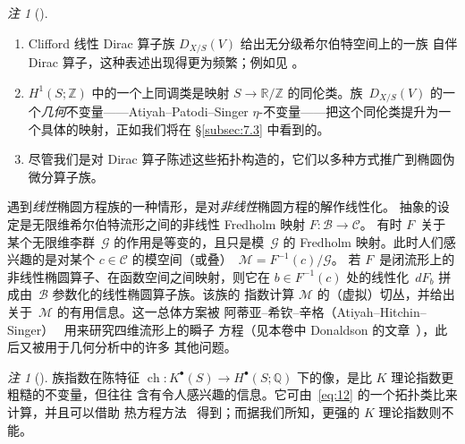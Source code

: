 \documentclass[11pt]{amsart}
\theoremstyle{definition}
\theoremstyle{remark}
\newtheorem{remark}[equation]{注}
\theoremstyle{plain}
\numberwithin{equation}{section}
\renewcommand{\:}{\colon}
\newcommand{\QQ}{{\mathbb Q}}
\newcommand{\RR}{{\mathbb R}}
\newcommand{\ZZ}{{\mathbb Z}}
\DeclareMathOperator{\ch}{ch}
\DeclareMathOperator{\coker}{coker}
\newcommand{\inv}{^{-1}}
\DeclareMathOperator{\Todd}{Todd}
\newcommand{\RZ}{\RR/\ZZ}
\newcommand{\sB}{\mathscr{B}}
\newcommand{\sC}{\mathscr{C}}
\newcommand{\sG}{\mathscr{G}}
\newcommand{\sM}{\mathscr{M}}
\begin{document}
  \begin{remark}[]\label{thm:15}
 \ 
 \begin{enumerate}%

 \item Clifford 线性 Dirac 算子族 $D_{X/S}(V)$ 给出无分级希尔伯特空间上的一族
自伴 Dirac 算子，这种表述出现得更为频繁；例如见 \cite[\S3]{APS3}。

 \item $H^1(S;\ZZ)$ 中的一个上同调类是映射 $S\to
\RZ$ 的同伦类。族~$D_{X/S}(V)$ 的一个\emph{几何}不变量——Atiyah–Patodi–Singer
$\eta $-不变量——把这个同伦类提升为一个具体的映射，正如我们将在
\S\ref{subsec:7.3} 中看到的。

 \item 尽管我们是对 Dirac 算子陈述这些拓扑构造的，它们以多种方式推广到椭圆伪
微分算子族。

 \end{enumerate}
  \end{remark}

遇到\emph{线性}椭圆方程族的一种情形，是对\emph{非线性}椭圆方程的解作线性化。
抽象的设定是无限维希尔伯特流形之间的非线性 Fredholm 映射 $F\:\sB\to\sC$。
有时 $F$~关于某个无限维李群~$\sG$ 的作用是等变的，且只是模~$\sG$ 的 Fredholm
映射。此时人们感兴趣的是对某个 $c\in \sC$ 的模空间（或叠）~$\sM=F\inv (c)/\sG$。
若 $F$~是闭流形上的非线性椭圆算子、在函数空间之间映射，则它在
$b\in F\inv (c)$ 处的线性化~$dF_b$ 拼成由~$\sB$ 参数化的线性椭圆算子族。该族的
指数计算 $\sM$ 的（虚拟）切丛，并给出关于~$\sM$ 的有用信息。这一总体方案被
阿蒂亚–希钦–辛格（Atiyah–Hitchin–Singer）~\cite{AHS} 用来研究四维流形上的瞬子
方程（见本卷中 Donaldson 的文章~\cite[\S2]{Do}），此后又被用于几何分析中的许多
其他问题。

  \begin{remark}[]\label{thm:11}
 族指数在陈特征 $\ch\:K^{\bullet
}(S)\to H^{\bullet }(S;\QQ)$ 下的像，是比 $K$ 理论指数更粗糙的不变量，但往往
含有令人感兴趣的信息。它可由~\eqref{eq:12} 的一个拓扑类比来计算，并且可以借助
热方程方法~\cite{Bi2} 得到；而据我们所知，更强的 $K$ 理论指数则不能。
  \end{remark}
\end{document}
